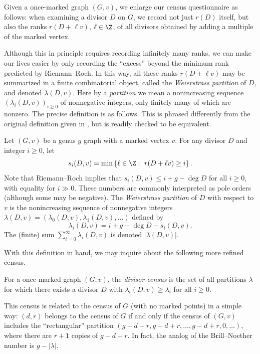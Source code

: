 Given a once-marked graph $(G,v)$, we enlarge our census questionnaire as follows: when examining a divisor $D$ on $G$, we record not just $r(D)$ itself, but also the ranks $r(D+\ell v)$, $\ell \in \Z$, of all divisors obtained by adding a multiple of the marked vertex.

Although this in principle requires recording infinitely many ranks, we can make our lives easier by only recording the ``excess'' beyond the minimum rank predicted by Riemann--Roch. In this way, all these ranks $r(D + \ell v)$ may be summarized in a finite combinatorial object, called the \emph{Weierstrass partition} of $D$, and denoted $\lambda(D,v)$. Here by a \emph{partition} we mean a nonincreasing sequence $(\lambda_i(D,v))_{i \geq 0}$ of nonnegative integers, only finitely many of which are nonzero. The precise definition is as follows. This is phrased differently from the original definition given in \cite{Pfl17}, but is readily checked to be equivalent.

\begin{defi}
Let $(G,v)$ be a genus $g$ graph with a marked vertex $v$. For any divisor $D$ and integer $i \geq 0$, let
$$s_i(D,v) = \operatorname{min} \left\{ \ell \in \Z:\ r(D+\ell v) \geq i \right\}.$$
Note that Riemann--Roch implies that $s_i(D,v) \leq i + g - \deg D$ for all $i \geq 0$, with equality for $i \gg 0$.
These numbers are commonly interpreted as pole orders (although some may be negative).
The \emph{Weierstrass partition} of $D$ with respect to $v$ is the nonincreasing sequence of nonnegative integers 
$\lambda(D,v) = (\lambda_0(D,v), \lambda_1(D,v), \ldots)$
defined by $$\lambda_i(D,v) = i  + g - \deg D- s_i(D,v).$$
The (finite) sum $\displaystyle \sum_{i=0}^\infty \lambda_i(D,v)$ is denoted $| \lambda(D,v) |$.
\end{defi}

With this definition in hand, we may inquire about the following more refined census.

\begin{defi}
For a once-marked graph $(G,v)$, the \emph{divisor census} is the set of all partitions $\lambda$ for which there exists a divisor $D$ with $\lambda_i(D,v) \geq \lambda_i$ for all $i \geq 0$.
\end{defi}

This census is related to the census of $G$ (with no marked points) in a simple way: $(d,r)$ belongs to the census of $G$ if and only if the census of $(G,v)$ includes the ``rectangular'' partition $(g-d+r,g-d+r,\ldots,g-d+r,0,\ldots)$, where there are $r+1$ copies of $g-d+r$. In fact, the analog of the Brill--Noether number is $g - |\lambda|$.

